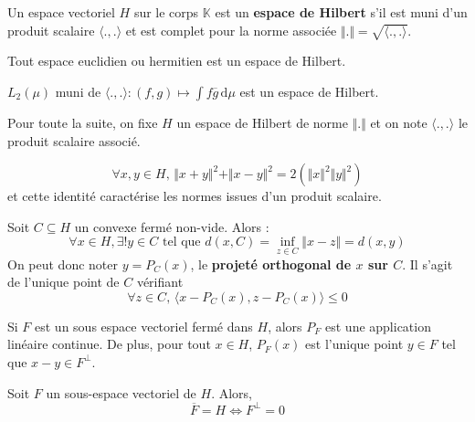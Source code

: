 	
	\begin{definition}
		Un espace vectoriel $H$ sur le corps $\mathbb{K}$ est un \textbf{espace de Hilbert} s'il est muni d'un produit scalaire $\langle . , . \rangle$ et est complet pour la norme associée $\Vert . \Vert = \sqrt{\langle . , . \rangle}$.
	\end{definition}
	
	\begin{example}
		Tout espace euclidien ou hermitien est un espace de Hilbert.
	\end{example}
	
	\begin{example}
		$L_2(\mu)$ muni de $\langle . , . \rangle : (f,g) \mapsto \int f \overline{g} \, \mathrm{d}\mu$ est un espace de Hilbert.
	\end{example}
	
	Pour toute la suite, on fixe $H$ un espace de Hilbert de norme $\Vert . \Vert$ et on note $\langle ., . \rangle$ le produit scalaire associé.
	
	\begin{lemma}
		\[ \forall x, y \in H, \, \Vert x + y \Vert^2 + \Vert x - y \Vert^2 = 2(\Vert x \Vert^2 \Vert y \Vert^2) \]
		et cette identité caractérise les normes issues d'un produit scalaire.
	\end{lemma}
	
	
	\begin{theorem}
		Soit $C \subseteq H$ un convexe fermé non-vide. Alors :
		\[ \forall x \in H, \exists! y \in C \text{ tel que } d(x, C) = \inf_{z \in C} \Vert x - z \Vert = d(x, y) \]
		On peut donc noter $y = P_C(x)$, le \textbf{projeté orthogonal de $x$ sur $C$}. Il s'agit de l'unique point de $C$ vérifiant
		\[ \forall z \in C, \, \langle x - P_C(x), z - P_C(x) \rangle \leq 0 \]
	\end{theorem}
	
	\begin{theorem}
		Si $F$ est un sous espace vectoriel fermé dans $H$, alors $P_F$ est une application linéaire continue. De plus, pour tout $x \in H$, $P_F(x)$ est l'unique point $y \in F$ tel que $x-y \in F^\perp$.
	\end{theorem}
	
	\begin{corollary}
		Soit $F$ un sous-espace vectoriel de $H$. Alors,
		\[ \overline{F} = H \iff F^\perp = 0 \]
	\end{corollary}
	
